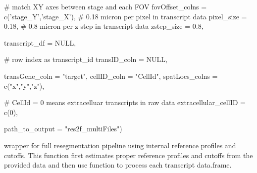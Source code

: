 \documentclass[letterpaper]{book}
\begin{document}
\begin{Examples}
\begin{ExampleCode}
                                  # match XY axes between stage and each FOV
                                  fovOffset_colns = c('stage_Y','stage_X'), 
                                  # 0.18 micron per pixel in transcript data
                                  pixel_size = 0.18, 
                                  # 0.8 micron per z step in transcript data
                                  zstep_size = 0.8, 
                                  
                                  transcript_df = NULL,
                                  
                                  # row index as transcript_id
                                  transID_coln = NULL, 
                                  
                                  transGene_coln = "target",
                                  cellID_coln = "CellId",
                                  spatLocs_colns = c("x","y","z"),
                                  
                                  # CellId = 0 means extracelluar transcripts in raw data
                                  extracellular_cellID = c(0), 
                                  
                                  path_to_output = "res2f_multiFiles")
\end{ExampleCode}
\end{Examples}
%
\begin{Description}
wrapper for full resegmentation pipeline using internal reference profiles and cutoffs. This function first estimates proper reference profiles and cutoffs from the provided data and then use  function to process each transcript data.frame.
\end{Description}
%
\end{document}
